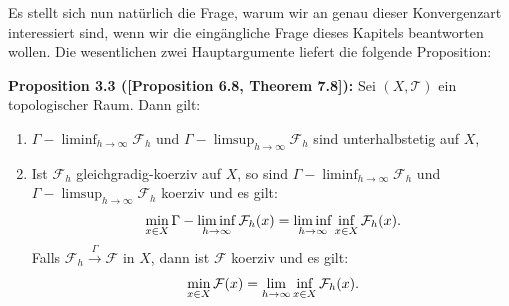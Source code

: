 Es stellt sich nun natürlich die Frage, warum wir an genau dieser Konvergenzart interessiert sind, wenn wir die eingängliche Frage dieses Kapitels beantworten wollen. Die wesentlichen zwei Hauptargumente liefert die folgende Proposition:\\[0.5cm]
\colorbox{generalYellow}{\begin{minipage}{16cm}{\textcolor{black}{}{\label{prop3.3}}}
\textbf{Proposition 3.3 (\cite{MasoGamma}[Proposition 6.8, Theorem 7.8]):} Sei \((X,\mathcal{T})\) ein topologischer Raum. Dann gilt:
\begin{enumerate}
    \item \(\Gamma-\liminf_{h \to \infty} \mathcal{F}_h\) und \(\Gamma-\limsup_{h \to \infty} \mathcal{F}_h\) sind unterhalbstetig auf \(X\),
    \item Ist \(\mathcal{F}_h\) gleichgradig-koerziv auf \(X\), so sind \(\Gamma-\liminf_{h \to \infty} \mathcal{F}_h\) und \(\Gamma-\limsup_{h \to \infty} \mathcal{F}_h\) koerziv und es gilt:
    \begin{equation}{\label{eq3.7}}
        \min_{x \in X} \Gamma-\liminf_{h \to \infty}\mathcal{F}_h(x) = \liminf_{h \to \infty} \inf_{x \in X} \mathcal{F}_h(x).
    \end{equation}
    Falls \(\mathcal{F}_h \stackrel{\Gamma}{\to} \mathcal{F}\) in \(X\), dann ist \(\mathcal{F}\) koerziv und es gilt:
    \begin{equation}{\label{eq3.8}}
        \min_{x \in X} \mathcal{F}(x) = \lim_{h \to \infty} \inf_{x \in X} \mathcal{F}_h(x).
    \end{equation}
\end{enumerate}
\end{minipage}}\\

